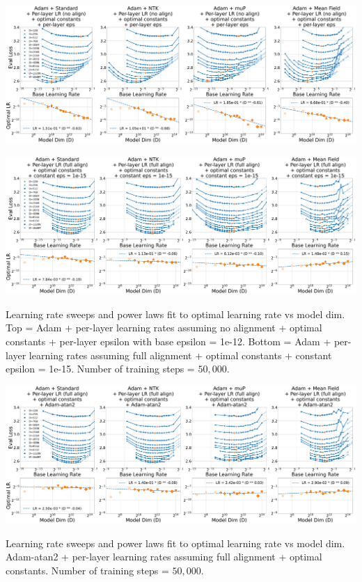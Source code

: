 \thispagestyle{plain}
\begin{SidewaysFigure}
\includegraphics[width=\linewidth]{icml2024/figures/lr_sweeps/appendix/adam/adam+50k_steps_per_module_lr_no_align_optimal_constants_per_module_eps_base_eps12.pdf}

\figvspace

\includegraphics[width=\linewidth]{icml2024/figures/lr_sweeps/appendix/adam/adam+50k_steps_per_module_lr_optimal_constants_eps15.pdf}
\caption{Learning rate sweeps and power laws fit to optimal learning rate vs model dim. Top = Adam + per-layer learning rates assuming no alignment + optimal constants + per-layer epsilon with base epsilon = 1e-12. Bottom = Adam + per-layer learning rates assuming full alignment + optimal constants + constant epsilon = 1e-15. Number of training steps = $50{,}000$.}
\end{SidewaysFigure}
\clearpage

\thispagestyle{plain}
\begin{SidewaysFigure}
\includegraphics[width=\linewidth]{icml2024/figures/lr_sweeps/appendix/adam/adam+50k_steps_per_module_lr_optimal_constants_atan2_scale1.pdf}
\caption{Learning rate sweeps and power laws fit to optimal learning rate vs model dim. Adam-atan2 + per-layer learning rates assuming full alignment + optimal constants. Number of training steps = $50{,}000$.}
\end{SidewaysFigure}
\clearpage

